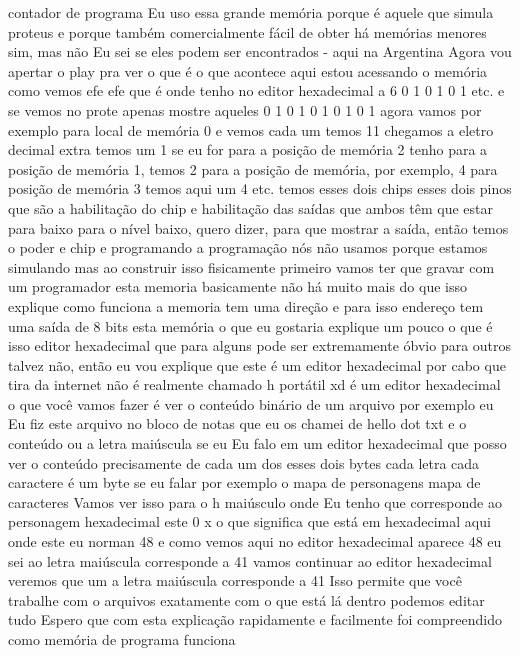 \documentclass[oneside,11pt]{memoir} %
\begin{document}
contador de programa  Eu uso essa grande memória porque é  aquele que simula proteus e porque também  comercialmente fácil de obter  há memórias menores sim, mas não  Eu sei se eles podem ser encontrados - aqui na Argentina  Agora vou apertar o play pra ver o que é  o que acontece aqui estou acessando o  memória como vemos efe efe que é  onde tenho no editor hexadecimal a 6  0 1 0 1 0 1 etc. e se vemos no  prote apenas mostre aqueles 0 1 0 1 0  1 0 1 0 1 agora vamos por exemplo para  local de memória 0  e vemos cada um temos 11 chegamos a  eletro decimal extra temos um 1  se eu for para a posição de memória 2  tenho  para a posição de memória 1, temos 2 para  a posição de memória, por exemplo, 4 para  posição de memória 3 temos aqui um  4 etc. temos esses dois chips esses  dois pinos que são a habilitação do  chip e habilitação das saídas  que ambos têm que estar para baixo para  o nível baixo, quero dizer, para que  mostrar a saída, então temos o  poder e chip e  programando a programação nós  não usamos porque estamos simulando  mas ao construir isso  fisicamente primeiro vamos ter que  gravar com um programador esta memoria  basicamente não há muito mais do que isso  explique como funciona a memoria  tem uma direção e para isso  endereço tem uma saída de 8 bits  esta memória o que eu gostaria  explique um pouco o que é isso  editor hexadecimal que para alguns  pode ser extremamente óbvio para  outros talvez não, então eu vou  explique que este é um editor hexadecimal  por cabo que tira da internet  não é realmente chamado h  portátil xd  é um editor hexadecimal o que você  vamos fazer é ver o conteúdo  binário de um arquivo por exemplo eu  Eu fiz este arquivo no bloco de notas  que eu os chamei de hello dot txt e o  conteúdo ou a letra maiúscula se eu  Eu falo em um editor hexadecimal que posso ver  o conteúdo precisamente de cada um dos  esses dois bytes cada letra cada caractere  é um byte se eu falar por exemplo o  mapa de personagens  mapa de caracteres  Vamos ver isso para o h maiúsculo onde  Eu tenho que corresponde ao personagem  hexadecimal este 0 x o que significa que  está em hexadecimal aqui onde este eu  norman 48 e como vemos aqui no editor  hexadecimal aparece 48 eu sei ao  letra maiúscula corresponde a 41 vamos continuar  ao editor hexadecimal veremos que um  a letra maiúscula corresponde a 41  Isso permite que você trabalhe com o  arquivos exatamente com o que está lá  dentro podemos editar tudo  Espero que com esta explicação  rapidamente e facilmente foi compreendido como  memória de programa funciona
\end{document}

